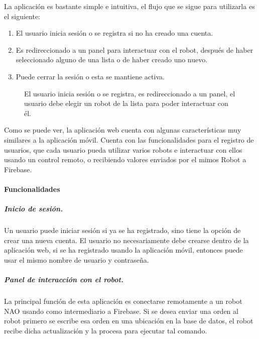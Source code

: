 La aplicación es bastante simple e intuitiva, el flujo que se sigue para
utilizarla es el siguiente:
\begin{enumerate}
\item {} 
El usuario inicia sesión o se registra si no ha creado una cuenta.

\item {} 
Es redireccionado a un panel para interactuar con el robot, después de haber seleccionado alguno de una lista o de haber creado uno nuevo.

\item {} 
Puede cerrar la sesión o esta se mantiene activa.

\end{enumerate}

\begin{figure}[htbp]
\centering
\capstart

\noindent{}
\caption{El usuario inicia sesión o se registra, es redireccionado a un panel, el usuario debe elegir un robot de la lista para poder interactuar con él.}\label{\detokenize{users_docs:webappflow}}\end{figure}

Como se puede ver, la aplicación web cuenta con algunas características
muy similares a la aplicación móvil. Cuenta con las funcionalidades para
el registro de usuarios, que cada usuario pueda utilizar varios robots e
interactuar con ellos usando un control remoto, o recibiendo valores enviados
por el mimos Robot a Firebase.


\paragraph{Funcionalidades}

\subparagraph{Inicio de sesión.}
\label{\detokenize{inicio-de-sesion}}
Un usuario puede iniciar sesión si ya se ha registrado, sino tiene la opción
de crear una nueva cuenta. El usuario no necesariamente debe crearse dentro
de la aplicación web, si se ha registrado usando la aplicación móvil, entonces
puede usar el mismo nombre de usuario y contraseña.


\subparagraph{Panel de interacción con el robot.}
\label{\detokenize{users_docs:panel-de-inteaccion-con-el-robot}}
La principal función de esta aplicación es conectarse remotamente a un robot
NAO usando como intermediario a Firebase. Si se desea enviar una orden al robot
primero se escribe esa orden en una ubicación en la base de datos, el robot
recibe dicha actualización y la procesa para ejecutar tal comando.

